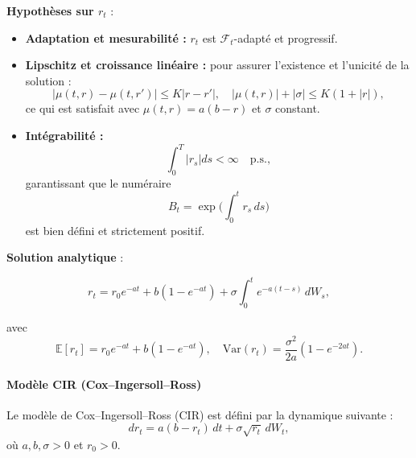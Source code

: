\textbf{Hypothèses sur $r_t$} :
\begin{itemize}
    \item \textbf{Adaptation et mesurabilité :} $r_t$ est $\mathcal{F}_t$-adapté et progressif.
    \item \textbf{Lipschitz et croissance linéaire :} pour assurer l'existence et l'unicité de la solution :
    \begin{equation}
        |\mu(t,r) - \mu(t,r')| \le K |r - r'|, \quad |\mu(t,r)| + |\sigma| \le K(1 + |r|),
        \label{eq:lipschitz_growth_vasicek}
    \end{equation}
    ce qui est satisfait avec $\mu(t,r) = a(b-r)$ et $\sigma$ constant.
    \item \textbf{Intégrabilité :} 
    \begin{equation}
        \int_0^T |r_s| ds < \infty \quad \text{p.s.},
    \end{equation}
    garantissant que le numéraire
    \begin{equation}
        B_t = \exp\Big(\int_0^t r_s \, ds\Big)
    \end{equation}
    est bien défini et strictement positif.
\end{itemize}

\vspace{0.5cm}

\textbf{Solution analytique} :

\begin{equation}
    r_t = r_0 e^{-a t} + b (1 - e^{-a t}) + \sigma \int_0^t e^{-a (t-s)} \, dW_s,
\end{equation}

avec
\begin{equation}
    \mathbb{E}[r_t] = r_0 e^{-a t} + b (1 - e^{-a t}), \quad
    \mathrm{Var}(r_t) = \frac{\sigma^2}{2a}(1 - e^{-2 a t}).
\end{equation}

\vspace{0.5cm}

\paragraph{Modèle CIR (Cox--Ingersoll--Ross)}

Le modèle de Cox--Ingersoll--Ross (CIR) est défini par la dynamique suivante :
\begin{equation}
dr_t = a (b - r_t)\,dt + \sigma \sqrt{r_t}\,dW_t,
\end{equation}
où $a,b,\sigma>0$ et $r_0>0$.

